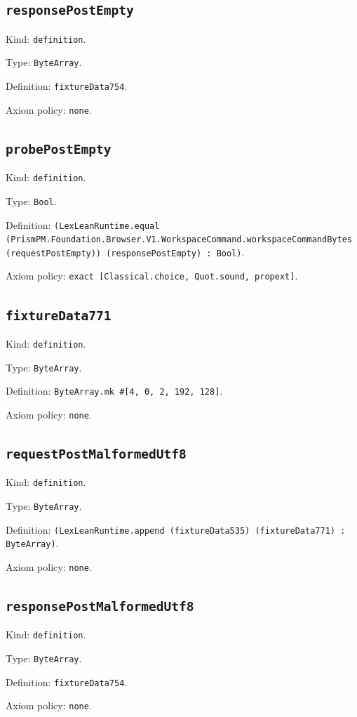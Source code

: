 \documentclass[11pt]{article}
\begin{document}
\subsection*{\texttt{responsePostEmpty}}
\noindent Kind: \texttt{definition}.\par
\noindent Type: \texttt{ByteArray}.\par
\noindent Definition: \texttt{fixtureData754}.\par
\noindent Axiom policy: \texttt{none}.\par
\subsection*{\texttt{probePostEmpty}}
\noindent Kind: \texttt{definition}.\par
\noindent Type: \texttt{Bool}.\par
\noindent Definition: \texttt{(LexLeanRuntime.equal (PrismPM.Foundation.Browser.V1.WorkspaceCommand.workspaceCommandBytes (requestPostEmpty)) (responsePostEmpty) : Bool)}.\par
\noindent Axiom policy: \texttt{exact [Classical.choice, Quot.sound, propext]}.\par
\subsection*{\texttt{fixtureData771}}
\noindent Kind: \texttt{definition}.\par
\noindent Type: \texttt{ByteArray}.\par
\noindent Definition: \texttt{ByteArray.mk \#[4, 0, 2, 192, 128]}.\par
\noindent Axiom policy: \texttt{none}.\par
\subsection*{\texttt{requestPostMalformedUtf8}}
\noindent Kind: \texttt{definition}.\par
\noindent Type: \texttt{ByteArray}.\par
\noindent Definition: \texttt{(LexLeanRuntime.append (fixtureData535) (fixtureData771) : ByteArray)}.\par
\noindent Axiom policy: \texttt{none}.\par
\subsection*{\texttt{responsePostMalformedUtf8}}
\noindent Kind: \texttt{definition}.\par
\noindent Type: \texttt{ByteArray}.\par
\noindent Definition: \texttt{fixtureData754}.\par
\noindent Axiom policy: \texttt{none}.\par
\end{document}
